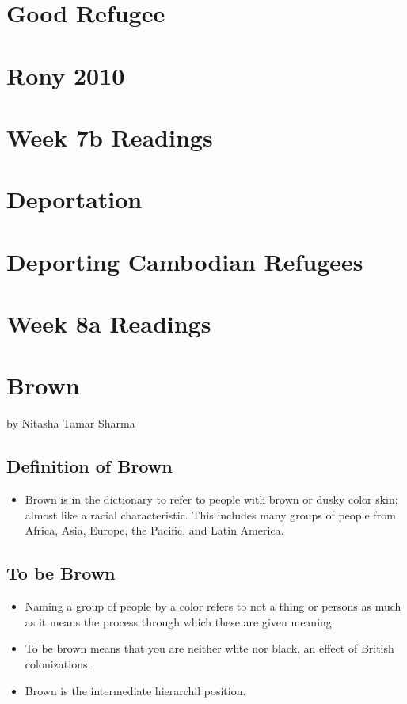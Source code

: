 \documentclass{article}
\begin{document}
  \section{Good Refugee}
  \section{Rony 2010}

  \newpage
  \section*{Week 7b Readings}
  \section{Deportation}
  \section{Deporting Cambodian Refugees}



  \newpage
  \section*{Week 8a Readings}

  \section{Brown}
  by Nitasha Tamar Sharma

  \subsection{Definition of Brown}
  \begin{itemize}
    \item Brown is in the dictionary to refer to people
      with brown or dusky color skin;
      almost like a racial characteristic.
      This includes many groups of people from Africa, Asia, Europe,
      the Pacific, and Latin America.
  \end{itemize}

  \subsection{To be Brown}
  \begin{itemize}
    \item Naming a group of people by a color refers to not
      a thing or persons as much as it means the process through
      which these are given meaning.
    \item To be brown means that you are neither whte nor black,
      an effect of British colonizations.
    \item Brown is the intermediate hierarchil position.
  \end{itemize}
\end{document}
